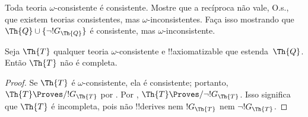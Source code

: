 \documentclass[../../../include/open-logic-section]{subfiles}
\begin{document}
\begin{prob}
  Toda teoria $\omega$-consistente é consistente. Mostre que a recíproca não
  vale, O.s.\@, que existem teorias consistentes, mas
  $\omega$-inconsistentes. Faça isso mostrando que $\Th{Q} \cup
  \{\lnot !G_\Th{Q}\}$ é consistente, mas $\omega$-inconsistente.
\end{prob}

\begin{thm}
 Seja $\Th{T}$ qualquer teoria
$\omega$-consistente e !!{axiomatizable} que estenda~$\Th{Q}$. Então
$\Th{T}$ não é completa.
\end{thm}

\begin{proof}
  Se $\Th{T}$ é $\omega$-consistente, ela é consistente; portanto,
  $\Th{T} \Proves/ !G_\Th{T}$ por . Por
  , $\Th{T} \Proves/ \lnot !G_\Th{T}$.
  Isso significa que $\Th{T}$ é incompleta, pois não !!{derive}s nem
  $!G_\Th{T}$ nem $\lnot !G_\Th{T}$.
\end{proof}
\end{document}

